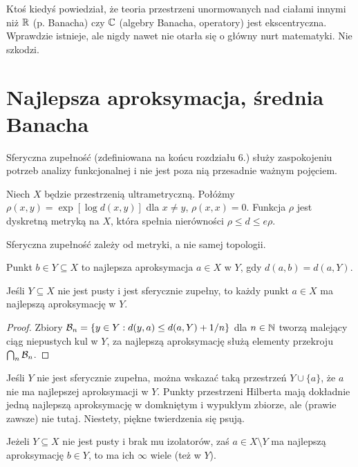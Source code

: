 Ktoś kiedyś powiedział, że teoria przestrzeni unormowanych nad ciałami innymi niż $\mathbb R$ (p. Banacha) czy $\mathbb C$ (algebry Banacha, operatory) jest ekscentryczna.
Wprawdzie istnieje, ale nigdy nawet nie otarła się o główny nurt matematyki.
Nie szkodzi.

\section{Najlepsza aproksymacja, średnia Banacha}
Sferyczna zupełność (zdefiniowana na końcu rozdziału 6.) służy zaspokojeniu potrzeb analizy funkcjonalnej i nie jest poza nią przesadnie ważnym pojęciem.

\begin{fakt}
	Niech  $X$ będzie przestrzenią ultrametryczną.
	Połóżmy $\rho(x, y) = \exp [\log d(x, y)]$ dla $x \neq y$, $\rho(x, x) = 0$.
	Funkcja $\rho$ jest dyskretną metryką na $X$, która spełnia nierówności $\rho \le d \le e \rho$.
\end{fakt}

\begin{wniosek}
	Sferyczna zupełność zależy od metryki, a nie samej topologii.
\end{wniosek}

\begin{definicja}
	Punkt  $b \in Y \subseteq X$ to najlepsza aproksymacja $a \in X$ w $Y$, gdy $d(a, b) = d(a, Y)$.
\end{definicja}

\begin{fakt}
	Jeśli $Y \subseteq X$ nie jest pusty i jest sferycznie zupełny, to każdy punkt $a \in X$ ma najlepszą aproksymację w $Y$.
\end{fakt}

\begin{proof}
	Zbiory $\mathcal B_n = \{y \in Y : d(y, a) \le d(a, Y) + 1/n\}$ dla $n \in \mathbb N$ tworzą malejący ciąg niepustych kul w $Y$, za najlepszą aproksymację służą elementy przekroju $\bigcap_n \mathcal B_n$.
\end{proof}

Jeśli $Y$ nie jest sferycznie zupełna, można wskazać taką przestrzeń $Y \cup \{a\}$, że $a$ nie ma najlepszej aproksymacji w $Y$.
Punkty przestrzeni Hilberta mają dokładnie jedną najlepszą aproksymację w domkniętym i wypukłym zbiorze, ale (prawie zawsze) nie tutaj.
Niestety, piękne twierdzenia się psują.

\begin{fakt}
	Jeżeli $Y \subseteq X$ nie jest pusty i brak mu izolatorów, zaś $a \in X \setminus Y$ ma najlepszą aproksymację $b \in Y$, to ma ich $\infty$ wiele (też w $Y$).
\end{fakt}

